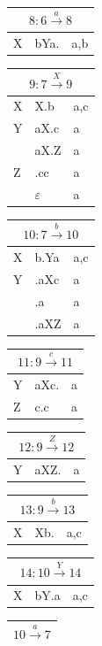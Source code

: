 \documentclass[11pt]{scrartcl}
\begin{document}
	\begin{table}[!htbp]
			\begin{tabular}[t]{l|l|l}
				\multicolumn{3}{c}{$8: 6 \xrightarrow{a} 8$} \\ \hline
				X & bYa. & a,b \\ 
			\end{tabular}
			\begin{tabular}[t]{l|l|l}
				\multicolumn{3}{c}{$9: 7 \xrightarrow{X} 9$} \\ \hline
				X & X.b & a,c \\ \hline
				Y & aX.c & a \\ 
				 & aX.Z & a \\ \hline
				Z & .cc & a \\
				& $\varepsilon$ & a 
			\end{tabular}
			\begin{tabular}[t]{l|l|l}
				\multicolumn{3}{c}{$10: 7 \xrightarrow{b} 10$} \\ \hline
				X & b.Ya & a,c \\ \hline
				Y & .aXc & a \\ 
				& .a & a \\ 
				 & .aXZ & a \\
			\end{tabular}
		\end{table}

	\begin{table}[!htbp]
		\begin{tabular}[t]{l|l|l}
				\multicolumn{3}{c}{$11: 9 \xrightarrow{c} 11$} \\ \hline
				Y & aXc. & a \\ \hline
				Z & c.c & a
		\end{tabular}
		\begin{tabular}[t]{l|l|l}
			\multicolumn{3}{c}{$12: 9 \xrightarrow{Z} 12$} \\ \hline
			Y & aXZ. & a \\
		\end{tabular}
		\begin{tabular}[t]{l|l|l}
			\multicolumn{3}{c}{$13: 9 \xrightarrow{b} 13$} \\ \hline
			X & Xb. & a,c \\
		\end{tabular}
		\begin{tabular}[t]{l|l|l}
				\multicolumn{3}{c}{$14: 10 \xrightarrow{Y} 14$} \\ \hline
			X & bY.a & a,c \\
		\end{tabular}
		\begin{tabular}[t]{l}
				$10 \xrightarrow{a} 7$ \\ \hline
		\end{tabular}
	\end{table}
		
\end{document}
